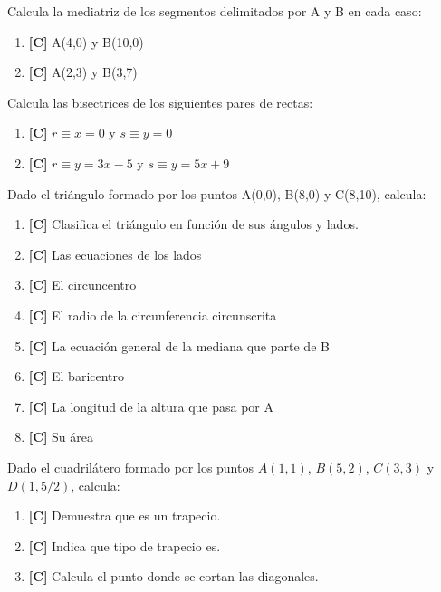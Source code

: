 \Exercicio Calcula la mediatriz de los segmentos delimitados por A y B en cada caso:

\begin{enumerate}[topsep=0pt]
\item \textbf{[C]} A(4,0) y B(10,0)
	\item \textbf{[C]} A(2,3) y B(3,7)
\end{enumerate}


\Exercicio Calcula las bisectrices de los siguientes pares de rectas:

\begin{enumerate}[topsep=0pt]
\item \textbf{[C]} $ r \equiv x=0 $ y $ s \equiv y = 0 $
	\item \textbf{[C]} $ r \equiv y = 3x - 5 $ y $ s \equiv y = 5x + 9 $
\end{enumerate}


\Exercicio Dado el triángulo formado por los puntos A(0,0), B(8,0) y C(8,10), calcula:

\begin{enumerate}[topsep=0pt]
\item \textbf{[C]} Clasifica el triángulo en función de sus ángulos y lados.
	\item \textbf{[C]} Las ecuaciones de los lados
	\item \textbf{[C]} El circuncentro
	\item \textbf{[C]} El radio de la circunferencia circunscrita
	\item \textbf{[C]} La ecuación general de la mediana que parte de B
	\item \textbf{[C]} El baricentro
	\item \textbf{[C]} La longitud de la altura que pasa por A
	\item \textbf{[C]} Su área
\end{enumerate}


\Exercicio Dado el cuadrilátero formado por los puntos $A(1,1)$, $B(5,2)$, $C(3,3)$ y $D(1, 5/2)$, calcula:

\begin{enumerate}[topsep=0pt]
\item \textbf{[C]} Demuestra que es un trapecio.
	\item \textbf{[C]} Indica que tipo de trapecio es.
	\item \textbf{[C]} Calcula el punto donde se cortan las diagonales.
\end{enumerate}


